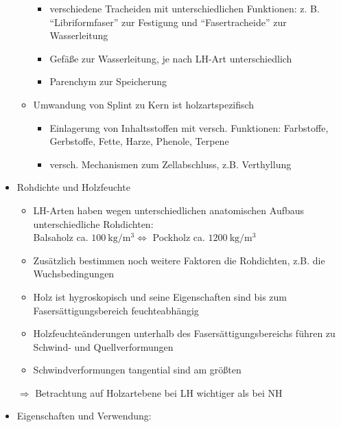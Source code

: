 \documentclass[fleqn,twoside]{article}
\begin{document}
\begin{itemize}
\begin{itemize}
                        \begin{itemize}
                            \item  verschiedene Tracheiden mit unterschiedlichen Funktionen:
                            z. B. \enquote{Libriformfaser} zur Festigung und
                            \enquote{Fasertracheide} zur Wasserleitung
                            \item  Gefäße zur Wasserleitung, je nach LH-Art unterschiedlich
                            \item  Parenchym zur Speicherung
                        \end{itemize}
                    \item Umwandung von Splint zu Kern ist holzartspezifisch
                        \begin{itemize}
                            \item  Einlagerung von Inhaltsstoffen mit versch. Funktionen: Farbstoffe, Gerbstoffe, Fette, Harze, Phenole, Terpene
                            \item versch. Mechanismen zum Zellabschluss, z.B. Verthyllung
                        \end{itemize}
                \end{itemize}
            \item Rohdichte und Holzfeuchte
                \begin{itemize}
                    \item LH-Arten haben wegen unterschiedlichen anatomischen Aufbaus unterschiedliche Rohdichten:\\
                    Balsaholz ca. $100 \mathrm{~kg} / \mathrm{m}^3 \Longleftrightarrow$ Pockholz ca. $1200 \mathrm{~kg} / \mathrm{m}^3$
                    \item Zusätzlich bestimmen noch weitere Faktoren die Rohdichten, z.B. die Wuchsbedingungen
                    \item Holz ist hygroskopisch und seine Eigenschaften sind bis zum Fasersättigungsbereich feuchteabhängig
                    \item Holzfeuchteänderungen unterhalb des Fasersättigungsbereichs führen zu Schwind- und Quellverformungen
                    \item Schwindverformungen tangential sind am größten
                \end{itemize}
                    $\Rightarrow$ Betrachtung auf Holzartebene bei LH wichtiger als bei NH
            \item Eigenschaften und Verwendung:

\end{itemize}
\end{document}
